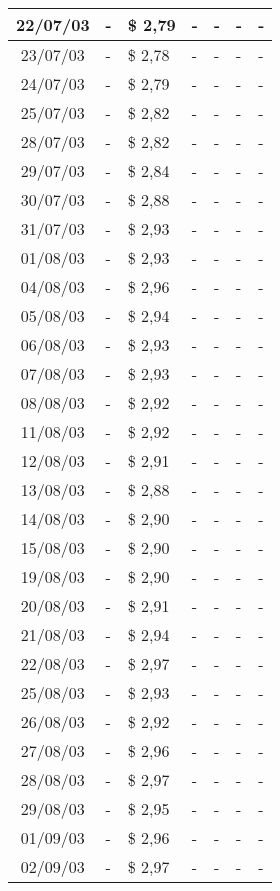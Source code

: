 \begin{center}
\begin{longtable}{|c|p{1.5cm}|p{1.5cm}|p{1.5cm}|p{1.5cm}|p{1.5cm}|p{1.5cm}|}
22/07/03 & - & \$ 2,79 & - & - & - & - \\ \hline
23/07/03 & - & \$ 2,78 & - & - & - & - \\ \hline
24/07/03 & - & \$ 2,79 & - & - & - & - \\ \hline
25/07/03 & - & \$ 2,82 & - & - & - & - \\ \hline
28/07/03 & - & \$ 2,82 & - & - & - & - \\ \hline
29/07/03 & - & \$ 2,84 & - & - & - & - \\ \hline
30/07/03 & - & \$ 2,88 & - & - & - & - \\ \hline
31/07/03 & - & \$ 2,93 & - & - & - & - \\ \hline
01/08/03 & - & \$ 2,93 & - & - & - & - \\ \hline
04/08/03 & - & \$ 2,96 & - & - & - & - \\ \hline
05/08/03 & - & \$ 2,94 & - & - & - & - \\ \hline
06/08/03 & - & \$ 2,93 & - & - & - & - \\ \hline
07/08/03 & - & \$ 2,93 & - & - & - & - \\ \hline
08/08/03 & - & \$ 2,92 & - & - & - & - \\ \hline
11/08/03 & - & \$ 2,92 & - & - & - & - \\ \hline
12/08/03 & - & \$ 2,91 & - & - & - & - \\ \hline
13/08/03 & - & \$ 2,88 & - & - & - & - \\ \hline
14/08/03 & - & \$ 2,90 & - & - & - & - \\ \hline
15/08/03 & - & \$ 2,90 & - & - & - & - \\ \hline
19/08/03 & - & \$ 2,90 & - & - & - & - \\ \hline
20/08/03 & - & \$ 2,91 & - & - & - & - \\ \hline
21/08/03 & - & \$ 2,94 & - & - & - & - \\ \hline
22/08/03 & - & \$ 2,97 & - & - & - & - \\ \hline
25/08/03 & - & \$ 2,93 & - & - & - & - \\ \hline
26/08/03 & - & \$ 2,92 & - & - & - & - \\ \hline
27/08/03 & - & \$ 2,96 & - & - & - & - \\ \hline
28/08/03 & - & \$ 2,97 & - & - & - & - \\ \hline
29/08/03 & - & \$ 2,95 & - & - & - & - \\ \hline
01/09/03 & - & \$ 2,96 & - & - & - & - \\ \hline
02/09/03 & - & \$ 2,97 & - & - & - & - \\ \hline

\end{longtable}
\end{center}
